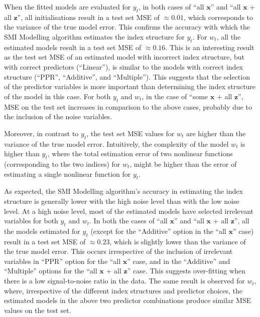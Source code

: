 \documentclass[
  11pt,
  a4paper,
]{report}
\begin{document}
When the fitted models are evaluated for \(y_{t}\), in both cases of
``all \(\bm{x}\)'' and ``all \(\bm{x}\) + all \(\bm{z}\)'', all
initialisations result in a test set MSE of \(\approx 0.01\), which
corresponds to the variance of the true model error. This confirms the
accuracy with which the SMI Modelling algorithm estimates the index
structure for \(y_{t}\). For \(w_{t}\), all the estimated models result
in a test set MSE of \(\approx 0.16\). This is an interesting result as
the test set MSE of an estimated model with incorrect index structure,
but with correct predictors (``Linear''), is similar to the models with
correct index structure (``PPR'', ``Additive'', and ``Multiple''). This
suggests that the selection of the predictor variables is more important
than determining the index structure of the model in this case. For both
\(y_{t}\) and \(w_{t}\), in the case of ``some \(\bm{x}\) + all
\(\bm{z}\)'', MSE on the test set increases in comparison to the above
cases, probably due to the inclusion of the noise variables.

Moreover, in contrast to \(y_{t}\), the test set MSE values for
\(w_{t}\) are higher than the variance of the true model error.
Intuitively, the complexity of the model \(w_{t}\) is higher than
\(y_{t}\), where the total estimation error of two nonlinear functions
(corresponding to the two indices) for \(w_{t}\), might be higher than
the error of estimating a single nonlinear function for \(y_{t}\).

As expected, the SMI Modelling algorithm's accuracy in estimating the
index structure is generally lower with the high noise level than with
the low noise level. At a high noise level, most of the estimated models
have selected irrelevant variables for both \(y_{t}\) and \(w_{t}\). In
both the cases of ``all \(\bm{x}\)'' and ``all \(\bm{x}\) + all
\(\bm{z}\)'', all the models estimated for \(y_{t}\) (except for the
``Additive'' option in the ``all \(\bm{x}\)'' case) result in a test set
MSE of \(\approx 0.23\), which is slightly lower than the variance of
the true model error. This occurs irrespective of the inclusion of
irrelevant variables in ``PPR'' option for the ``all \(\bm{x}\)'' case,
and in the ``Additive'' and ``Multiple'' options for the ``all
\(\bm{x}\) + all \(\bm{z}\)'' case. This suggests over-fitting when
there is a low signal-to-noise ratio in the data. The same result is
observed for \(w_{t}\), where, irrespective of the different index
structures and predictor choices, the estimated models in the above two
predictor combinations produce similar MSE values on the test set.
\end{document}
